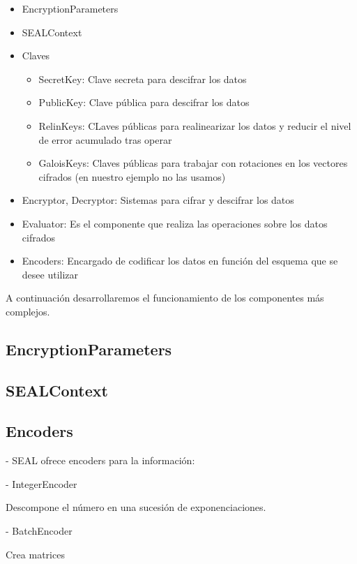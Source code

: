 \begin{itemize}
  \item EncryptionParameters
  \item SEALContext
  \item Claves
  \begin{itemize}
    \item SecretKey: Clave secreta para descifrar los datos
    \item PublicKey: Clave pública para descifrar los datos
    \item RelinKeys: CLaves públicas para realinearizar los datos y reducir el nivel de error acumulado tras operar
    \item GaloisKeys: Claves públicas para trabajar con rotaciones en los vectores cifrados (en nuestro ejemplo no las usamos)
  \end{itemize}
  \item Encryptor, Decryptor: Sistemas para cifrar y descifrar los datos
  \item Evaluator: Es el componente que realiza las operaciones sobre los datos cifrados
  \item Encoders: Encargado de codificar los datos en función del esquema que se desee utilizar
\end{itemize}

A continuación desarrollaremos el funcionamiento de los componentes más complejos.

\subsection{EncryptionParameters}



\subsection{SEALContext}



\subsection{Encoders}

- SEAL ofrece encoders para la información:

    - IntegerEncoder

    Descompone el número en una sucesión de exponenciaciones.

    - BatchEncoder

    Crea matrices

